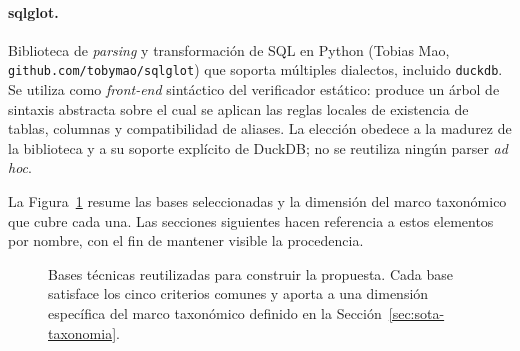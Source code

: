 \paragraph{sqlglot.}
Biblioteca de \emph{parsing} y transformación de SQL en Python (Tobias Mao, \texttt{github.com/tobymao/sqlglot}) que soporta múltiples dialectos, incluido \texttt{duckdb}. Se utiliza como \emph{front-end} sintáctico del verificador estático: produce un árbol de sintaxis abstracta sobre el cual se aplican las reglas locales de existencia de tablas, columnas y compatibilidad de aliases. La elección obedece a la madurez de la biblioteca y a su soporte explícito de DuckDB; no se reutiliza ningún parser \emph{ad hoc}.

\medskip

La Figura~\ref{fig:prop-bases} resume las bases seleccionadas y la dimensión del marco taxonómico que cubre cada una. Las secciones siguientes hacen referencia a estos elementos por nombre, con el fin de mantener visible la procedencia.

\begin{figure}[htb]
    \centering
    \caption{Bases técnicas reutilizadas para construir la propuesta. Cada base satisface los cinco criterios comunes y aporta a una dimensión específica del marco taxonómico definido en la Sección~\ref{sec:sota-taxonomia}.}
    \label{fig:prop-bases}
\end{figure}

